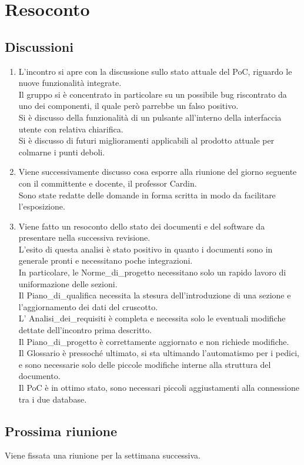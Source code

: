 \section{Resoconto} \label{sec:resoconto}
\subsection{Discussioni} \label{subsec:resdiscussione}
\begin{enumerate}
    \item L'incontro si apre con la discussione sullo stato attuale del PoC, riguardo le nuove funzionalità integrate. \\Il gruppo si è concentrato in particolare su un possibile bug riscontrato da uno dei componenti, il quale però parrebbe un falso positivo. \\Si è discusso della funzionalità di un pulsante all'interno della interfaccia utente con relativa chiarifica. \\Si è discusso di futuri miglioramenti applicabili al prodotto attuale per colmarne i punti deboli.
    \item Viene successivamente discusso cosa esporre alla riunione del giorno seguente con il committente e docente, il professor Cardin. \\Sono state redatte delle domande in forma scritta in modo da facilitare l'esposizione.
    \item Viene fatto un resoconto dello stato dei documenti e del software da presentare nella successiva revisione.\\L'esito di questa analisi è stato positivo in quanto i documenti sono in generale pronti e necessitano poche integrazioni.\\ In particolare, le Norme\_di\_progetto necessitano solo un rapido lavoro di uniformazione delle sezioni. \\Il Piano\_di\_qualifica necessita la stesura dell'introduzione di una sezione e l'aggiornamento dei dati del cruscotto. \\L' Analisi\_dei\_requisiti è completa e necessita solo le eventuali modifiche dettate dell'incontro prima descritto. \\Il Piano\_di\_progetto è correttamente aggiornato e non richiede modifiche. \\Il Glossario è pressoché ultimato, si sta ultimando l'automatismo per i pedici, e sono necessarie solo delle piccole modifiche interne alla struttura del documento.\\Il PoC è in ottimo stato, sono necessari piccoli aggiustamenti alla connessione tra i due database.
\end{enumerate}


\subsection{Prossima riunione} \label{subsec:riunione}
Viene fissata una riunione per la settimana successiva.
